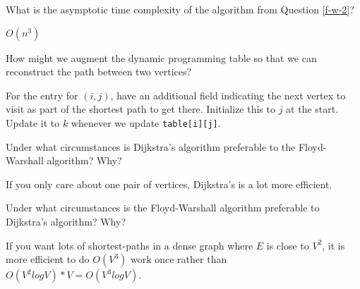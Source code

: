 \documentclass{tufte-handout}
\begin{document}
\begin{questions}
\item What is the asymptotic time complexity of the algorithm from Question \ref{f-w-2}?

{\color{red} $O(n^3)$}

\item How might we augment the dynamic programming table so that we can reconstruct the path between two vertices?

{\color{red} For the entry for $(i, j)$, have an additional field indicating the next vertex to visit as part of the shortest path to get there. Initialize this to $j$ at the start. Update it to $k$ whenever we update \verb|table[i][j]|.}

\item Under what circumstances is Dijkstra's algorithm preferable to the Floyd-Warshall algorithm? Why?

{\color{red} If you only care about one pair of vertices, Dijkstra's is a lot more efficient.}

\item Under what circumstances is the Floyd-Warshall algorithm preferable to Dijkstra's algorithm? Why?

{\color{red} If you want lots of shortest-paths in a dense graph where $E$ is close to $V^2$, it is more efficient to do $O(V^3)$ work once rather than $O(V^2 log V) * V = O(V^3 log V)$.}
\end{questions}
\end{document}
